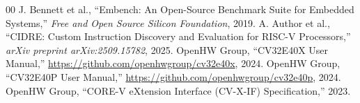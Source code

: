 \documentclass[conference]{IEEEtran}
\begin{document}
\balance
\begin{thebibliography}{00}
 J. Bennett et al., ``Embench: An Open-Source Benchmark Suite for Embedded Systems,'' \emph{Free and Open Source Silicon Foundation}, 2019.
 A. Author et al., ``CIDRE: Custom Instruction Discovery and Evaluation for RISC-V Processors,'' \emph{arXiv preprint arXiv:2509.15782}, 2025.
 OpenHW Group, ``CV32E40X User Manual,'' \url{https://github.com/openhwgroup/cv32e40x}, 2024.
 OpenHW Group, ``CV32E40P User Manual,'' \url{https://github.com/openhwgroup/cv32e40p}, 2024.
 OpenHW Group, ``CORE-V eXtension Interface (CV-X-IF) Specification,'' 2023.
\end{thebibliography}
\end{document}
